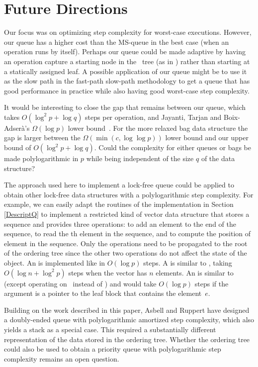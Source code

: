 
\section{Future Directions}

Our focus was on optimizing step complexity for worst-case executions.
However, our queue has a higher cost than the MS-queue in the best case (when an operation
runs by itself).
Perhaps our queue could be made adaptive by having an operation capture a starting node
in the \ordering\ tree (as in \cite{DBLP:conf/stoc/AfekDT95}) rather than starting at a statically assigned leaf.
A possible application of our queue  might be to use it as the slow path in the
fast-path slow-path methodology  \cite{10.1145/2370036.2145835} to
get a queue that has good performance in practice while also having good worst-case step complexity.

It would be interesting to close the gap that remains between our queue, which takes $O(\log^2 p + \log q)$ steps per operation,
and Jayanti, Tarjan and Boix-Adser\`{a}'s $\Omega(\log p)$ lower bound~\cite{JTB19}.
For the more relaxed bag data structure the gap is larger between the  $\Omega(\min(c,\log\log p))$ lower bound \cite{DBLP:conf/opodis/AttiyaF17} and our upper bound of $O(\log^2 p + \log q)$.
Could the complexity for either queues or bags be made polylogarithmic in $p$ while being independent of the size $q$ of the data structure?

The approach used here to implement a lock-free queue 
could be applied to obtain other lock-free
data structures with a polylogarithmic step complexity.
For example, we can easily adapt the routines of the implementation in Section \ref{DescriptQ} 
to implement a restricted kind of vector data structure that stores a sequence and
provides three operations:  to add an element  to the end of the sequence,
 to read the th element in the sequence, and
 to compute the position of element  in the sequence.
Only the  operations need to be propagated to the root of the ordering tree
since the other two operations do not affect the state of the object.
An  is implemented like  in $O(\log p)$ steps.  
A  is similar to , taking $O(\log n + \log^2p)$ steps when the vector has $n$ elements.  
An  is similar to  (except operating on \enqueues\ instead of \dequeues) and would take $O(\log p)$ steps if the argument is a pointer to the leaf block that contains the element~$e$.

Building on the work described in this paper, Asbell and Ruppert \cite{AR23} have
designed a doubly-ended queue with polylogarithmic amortized step
complexity, which also yields a stack as a special case.  
This required a substantially different representation of the data stored in the ordering tree.
Whether the ordering tree could also be used to obtain a priority queue with polylogarithmic step complexity
remains an open question.

